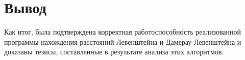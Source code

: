\pagebreak
\section{Вывод}
Как итог, была подтверждена корректная работоспособность реализованной программы нахождения расстояний Левенштейна и Дамерау-Левенштейна и доказаны тезисы, составленные в результате анализа этих алгоритмов.

